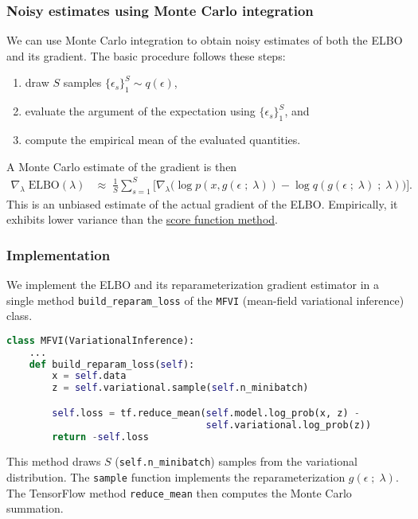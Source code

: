 \subsubsection{Noisy estimates using Monte Carlo integration}

We can use Monte Carlo integration to obtain noisy estimates of both the ELBO
and its gradient. The basic procedure follows these steps:
\begin{enumerate}
  \item draw $S$ samples $\{\epsilon_s\}_1^S \sim q(\epsilon)$,
  \item evaluate the argument of the expectation using $\{\epsilon_s\}_1^S$, and
  \item compute the empirical mean of the evaluated quantities.
\end{enumerate}

A Monte Carlo estimate of the gradient is then
\begin{align*}
  \nabla_\lambda\;
  \text{ELBO}(\lambda)
  &\approx\; 
  \frac{1}{S}
  \sum_{s=1}^{S}
  \big[
  \nabla_\lambda
  \big(
  \log p(x, g(\epsilon \;;\; \lambda))
  -
  \log q(g(\epsilon \;;\; \lambda) \;;\;\lambda)
  \big)
  \big].
\end{align*}
This is an unbiased estimate of the actual gradient of the ELBO. Empirically, it
exhibits lower variance than the 
\href{tut_KLqp_score.html}{score function method}.

\subsubsection{Implementation}

We implement the ELBO and its reparameterization gradient estimator in a single
method \texttt{build_reparam_loss} of the \texttt{MFVI} (mean-field variational
inference) class.
\begin{lstlisting}[language=Python]
class MFVI(VariationalInference):
    ...
    def build_reparam_loss(self):
        x = self.data
        z = self.variational.sample(self.n_minibatch)

        self.loss = tf.reduce_mean(self.model.log_prob(x, z) -
                                   self.variational.log_prob(z))
        return -self.loss
\end{lstlisting}

This method draws $S$ (\texttt{self.n_minibatch}) samples from the variational
distribution. The \texttt{sample} function implements the reparameterization
$g(\epsilon\;;\;\lambda)$. The TensorFlow method \texttt{reduce_mean} then
computes the Monte Carlo summation. 

